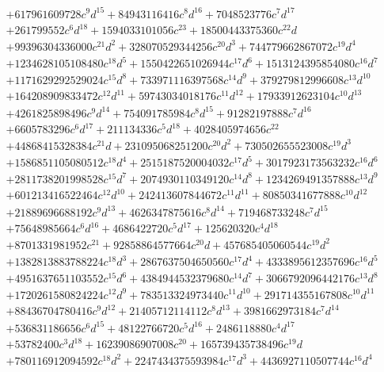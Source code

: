 {\begin{align*}
&+617961609728c^{9}d^{15}+84943116416c^{8}d^{16}+7048523776c^{7}d^{17}\\
&+261799552c^{6}d^{18}+1594033101056c^{23}+18500443375360c^{22}d\\
&+99396304336000c^{21}d^{2}+328070529344256c^{20}d^{3}+744779662867072c^{19}d^{4}\\
&+1234628105108480c^{18}d^{5}+1550422651026944c^{17}d^{6}+1513124395854080c^{16}d^{7}\\
&+1171629292529024c^{15}d^{8}+733971116397568c^{14}d^{9}+379279812996608c^{13}d^{10}\\
&+164208909833472c^{12}d^{11}+59743034018176c^{11}d^{12}+17933912623104c^{10}d^{13}\\
&+4261825898496c^{9}d^{14}+754091785984c^{8}d^{15}+91282197888c^{7}d^{16}\\
&+6605783296c^{6}d^{17}+211134336c^{5}d^{18}+4028405974656c^{22}\\
&+44868415328384c^{21}d+231095068251200c^{20}d^{2}+730502655523008c^{19}d^{3}\\
&+1586851105080512c^{18}d^{4}+2515187520004032c^{17}d^{5}+3017923173563232c^{16}d^{6}\\
&+2811738201998528c^{15}d^{7}+2074930110349120c^{14}d^{8}+1234269491357888c^{13}d^{9}\\
&+601213416522464c^{12}d^{10}+242413607844672c^{11}d^{11}+80850341677888c^{10}d^{12}\\
&+21889696688192c^{9}d^{13}+4626347875616c^{8}d^{14}+719468733248c^{7}d^{15}\\
&+75648985664c^{6}d^{16}+4686422720c^{5}d^{17}+125620320c^{4}d^{18}\\
&+8701331981952c^{21}+92858864577664c^{20}d+457685405060544c^{19}d^{2}\\
&+1382813883788224c^{18}d^{3}+2867637504650560c^{17}d^{4}+4333895612357696c^{16}d^{5}\\
&+4951637651103552c^{15}d^{6}+4384944532379680c^{14}d^{7}+3066792096442176c^{13}d^{8}\\
&+1720261580824224c^{12}d^{9}+783513324973440c^{11}d^{10}+291714355167808c^{10}d^{11}\\
&+88436704780416c^{9}d^{12}+21405712114112c^{8}d^{13}+3981662973184c^{7}d^{14}\\
&+536831186656c^{6}d^{15}+48122766720c^{5}d^{16}+2486118880c^{4}d^{17}\\
&+53782400c^{3}d^{18}+16239086907008c^{20}+165739435738496c^{19}d\\
&+780116912094592c^{18}d^{2}+2247434375593984c^{17}d^{3}+4436927110507744c^{16}d^{4}\\

\end{align*}}
